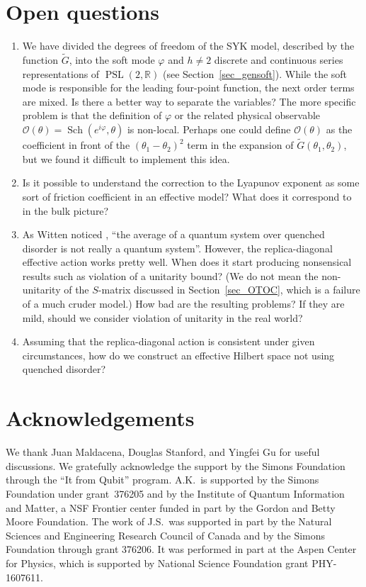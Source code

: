 \documentclass[12pt]{article}
\newcommand{\calO}{\mathcal{O}}
\newcommand{\RR}{\mathbb{R}}
\DeclareMathOperator{\PSL}{PSL}
\DeclareMathOperator{\Sch}{Sch}
\newcommand{\tG}{\widetilde{G}}
\newcommand{\vp}{\varphi}
\begin{document}
\section{Open questions}

\begin{enumerate}
\item We have divided the degrees of freedom of the SYK model, described by the function $\tG$, into the soft mode $\vp$ and $h\not=2$ discrete and continuous series representations of $\PSL(2,\RR)$ (see Section~\ref{sec_gensoft}). While the soft mode is responsible for the leading four-point function, the next order terms are mixed. Is there a better way to separate the variables? The more specific problem is that the definition of $\vp$ or the related physical observable $\calO(\theta)=\Sch(e^{i\vp},\theta)$ is non-local. Perhaps one could define $\calO(\theta)$ as the coefficient in front of the $(\theta_1-\theta_2)^2$ term in the expansion of $\tG(\theta_1,\theta_2)$, but we found it difficult to implement this idea.
\item Is it possible to understand the correction to the Lyapunov exponent as some sort of friction coefficient in an effective model? What does it correspond to in the bulk picture?
\item As Witten noticed \cite{Wi16}, ``the average of a quantum system over quenched disorder is not really a quantum system''. However, the replica-diagonal effective action works pretty well. When does it start producing nonsensical results such as violation of a unitarity bound? (We do not mean the non-unitarity of the $S$-matrix discussed in Section~\ref{sec_OTOC}, which is a failure of a much cruder model.) How bad are the resulting problems? If they are mild, should we consider violation of unitarity in the real world?
\item Assuming that the replica-diagonal action is consistent under given circumstances, how do we construct an effective Hilbert space not using quenched disorder?
\end{enumerate}


\section*{Acknowledgements}
We thank Juan Maldacena, Douglas Stanford, and Yingfei Gu for useful discussions. We gratefully acknowledge the support by the Simons Foundation through the ``It from Qubit'' program. A.K.\ is supported by the Simons Foundation under grant~376205 and by the Institute of Quantum Information and Matter, a NSF Frontier center funded in part by the Gordon and Betty Moore Foundation. The work of J.S.\ was supported in part by the Natural Sciences and Engineering Research Council of Canada and by the Simons Foundation through grant 376206. It was performed in part at the Aspen Center for Physics, which is supported by National Science Foundation grant PHY-1607611. 
\end{document}

